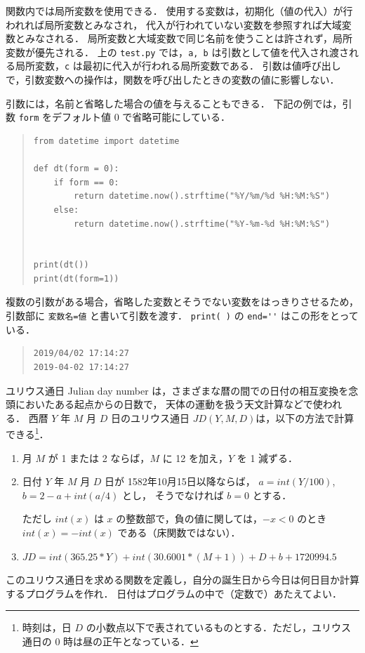\documentclass[11pt,a4,epsf]{article}
\begin{document}
関数内では局所変数を使用できる．
使用する変数は，初期化（値の代入）が行われれば局所変数とみなされ，
代入が行われていない変数を参照すれば大域変数とみなされる．
局所変数と大域変数で同じ名前を使うことは許されず，局所変数が優先される．
上の \verb+test.py+ では，\verb+a, b+ は引数として値を代入され渡される局所変数，\verb+c+ は最初に代入が行われる局所変数である．
引数は値呼び出しで，引数変数への操作は，関数を呼び出したときの変数の値に影響しない．

引数には，名前と省略した場合の値を与えることもできる．
下記の例では，引数 \verb+form+ をデフォルト値 0 で省略可能にしている．
\begin{quote}
\small
\begin{verbatim}
from datetime import datetime

def dt(form = 0):
    if form == 0:
        return datetime.now().strftime("%Y/%m/%d %H:%M:%S")
    else:
        return datetime.now().strftime("%Y-%m-%d %H:%M:%S")


print(dt())
print(dt(form=1))
\end{verbatim}
\end{quote}
複数の引数がある場合，省略した変数とそうでない変数をはっきりさせるため，引数部に \verb+変数名=値+ と書いて引数を渡す．
\verb+print( )+ の \verb+end=''+ はこの形をとっている．
\begin{quote}
\small
\begin{verbatim}
2019/04/02 17:14:27
2019-04-02 17:14:27
\end{verbatim}
\end{quote}

\begin{excercise}
ユリウス通日 Julian day number は，さまざまな暦の間での日付の相互変換を念頭においたある起点からの日数で，
天体の運動を扱う天文計算などで使われる．
西暦 $Y$ 年 $M$ 月 $D$ 日のユリウス通日 $\mathit{JD}(Y,M,D)$は，以下の方法で計算できる\footnote{時刻は，日 $D$ の小数点以下で表されているものとする．ただし，ユリウス通日の 0 時は昼の正午となっている．}．
\begin{enumerate}
\item
月 $M$ が 1 または 2 ならば，$M$ に 12 を加え，$Y$ を 1 減ずる．
\item
日付 $Y$ 年 $M$ 月 $D$ 日が 1582年10月15日以降ならば，
$a = int(Y/100)$, $b=2 - a + int(a/4)$ とし，
そうでなければ $b=0$ とする．

ただし $int(x)$ は $x$ の整数部で，負の値に関しては，$-x < 0$ のとき $\mathit{int}(x) = -\mathit{int}(x)$ である（床関数ではない）．
\item
$JD = \mathit{int}(365.25 * Y) + \mathit{int}(30.6001 * (M+1)) + D + b + 1720994.5$
\end{enumerate}

このユリウス通日を求める関数を定義し，自分の誕生日から今日は何日目か計算するプログラムを作れ．
日付はプログラムの中で（定数で）あたえてよい．
\end{excercise}
\end{document}
